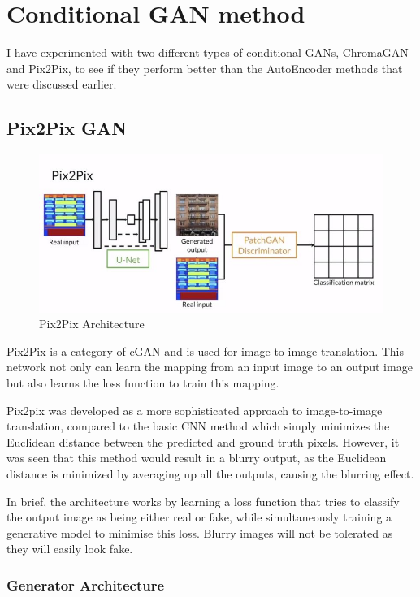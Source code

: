 \pagebreak
\section{Conditional GAN method}
I have experimented with two different types of conditional GANs, ChromaGAN and Pix2Pix, to see if they perform better than the AutoEncoder methods that were discussed earlier.

\subsection{Pix2Pix GAN}
\begin{figure}[H]
    \centering
    \includegraphics[width=1\columnwidth]{sections/figures/pix2pix_architecture.JPG}
    \caption{Pix2Pix Architecture \cite{DBLP:journals/corr/IsolaZZE16}}
    \label{fig:my_label}
\end{figure}

Pix2Pix is a category of cGAN and is used for image to image translation. This network not only can learn the mapping from an input image to an output image but also learns the loss function to train this mapping.

Pix2pix was developed as a more sophisticated approach to image-to-image translation, compared to the basic CNN method which simply minimizes the Euclidean distance between the predicted and ground truth pixels. However, it was seen that this method would result in a blurry output, as the Euclidean distance is minimized by averaging up all the outputs, causing the blurring effect.

In brief, the architecture works by learning a loss function that tries to classify the output image as being either real or fake, while simultaneously training a generative model to minimise this loss. Blurry images will not be tolerated as they will easily look fake.

\subsubsection*{Generator Architecture}

